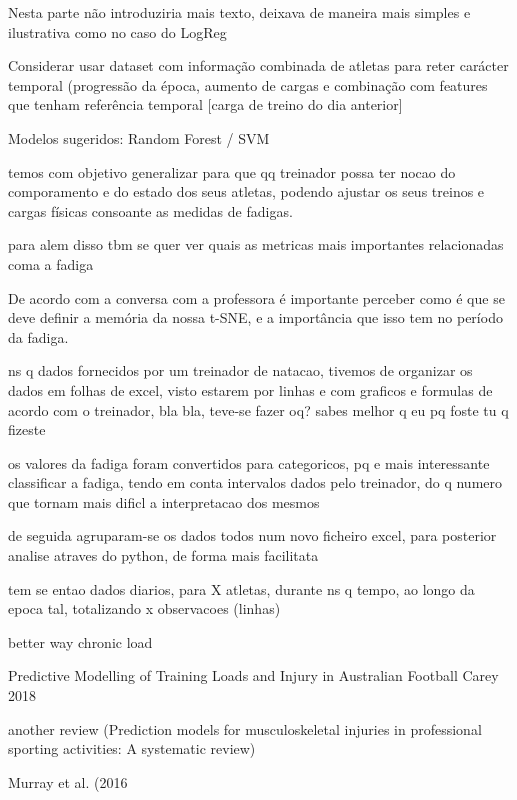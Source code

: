 \documentclass[conference]{IEEEtran}
\begin{document}
Nesta parte não introduziria mais texto, deixava de maneira mais simples e ilustrativa como no caso do LogReg


Considerar usar dataset com informação combinada de atletas para reter carácter temporal (progressão da época, aumento de cargas e combinação com features que tenham referência temporal [carga de treino do dia anterior]

Modelos sugeridos: Random Forest / SVM

temos com objetivo generalizar para que qq treinador possa ter nocao do comporamento e do estado dos seus atletas, podendo ajustar os seus treinos e cargas físicas consoante as medidas de fadigas.

para alem disso tbm se quer ver quais as metricas mais importantes relacionadas coma a fadiga

De acordo com a conversa com a professora é importante perceber como é que se deve definir a memória da nossa t-SNE, e a importância que isso tem no período da fadiga.

ns q dados fornecidos por um treinador de natacao, tivemos de organizar os dados em folhas de excel, visto estarem por linhas e com graficos e formulas de acordo com o treinador, bla bla, teve-se fazer oq? sabes melhor q eu pq foste tu q fizeste

os valores da fadiga foram convertidos para categoricos, pq e mais interessante classificar a fadiga, tendo em conta intervalos dados pelo treinador, do q numero que tornam mais dificl a interpretacao dos mesmos

de seguida agruparam-se os dados todos num novo ficheiro excel, para posterior analise atraves do python, de forma mais facilitata

tem se entao dados diarios, para X atletas, durante ns q tempo, ao longo da epoca tal, totalizando x observacoes (linhas)

\cite{Williams17} better way chronic load

\cite{Carey_2018} Predictive Modelling of Training Loads and Injury in Australian Football Carey 2018

\cite{Seow20} another review (Prediction models for musculoskeletal injuries in professional sporting activities: A systematic review)

\cite{Murray16} Murray et al. (2016







\end{document}
